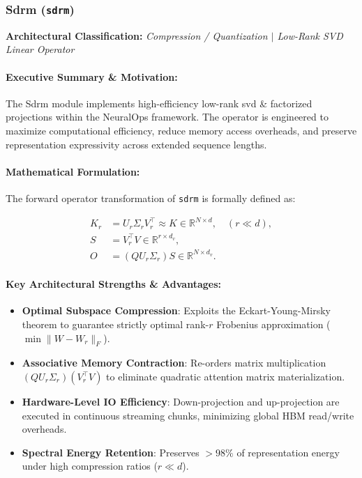 \subsubsection{Sdrm (\texttt{sdrm})}
\label{sec:module_sdrm}

\textbf{Architectural Classification:} \textit{Compression / Quantization $\mid$ Low-Rank SVD Linear Operator}

\paragraph{Executive Summary \& Motivation:}
The Sdrm module implements high-efficiency low-rank svd \& factorized projections within the NeuralOps framework. The operator is engineered to maximize computational efficiency, reduce memory access overheads, and preserve representation expressivity across extended sequence lengths.

\paragraph{Mathematical Formulation:}
The forward operator transformation of \texttt{sdrm} is formally defined as:

\begin{align}
K_r &= U_r \Sigma_r V_r^\top \approx K \in \mathbb{R}^{N \times d}, \quad (r \ll d), \\
S &= V_r^\top V \in \mathbb{R}^{r \times d_v}, \\
O &= (Q U_r \Sigma_r) S \in \mathbb{R}^{N \times d_v}.
\end{align}


\paragraph{Key Architectural Strengths \& Advantages:}
\begin{itemize}
    \item \textbf{Optimal Subspace Compression}: Exploits the Eckart-Young-Mirsky theorem to guarantee strictly optimal rank-$r$ Frobenius approximation ($\min \|W - W_r\|_F$).
    \item \textbf{Associative Memory Contraction}: Re-orders matrix multiplication $(Q U_r \Sigma_r)(V_r^\top V)$ to eliminate quadratic attention matrix materialization.
    \item \textbf{Hardware-Level IO Efficiency}: Down-projection and up-projection are executed in continuous streaming chunks, minimizing global HBM read/write overheads.
    \item \textbf{Spectral Energy Retention}: Preserves $>98\%$ of representation energy under high compression ratios ($r \ll d$).
\end{itemize}

